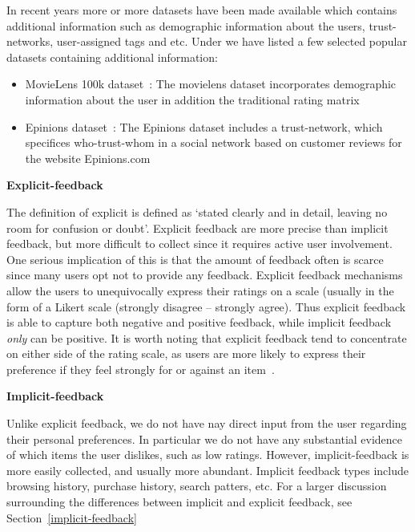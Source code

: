 In recent years more or more datasets have been made available which contains
additional information such as demographic information about the users,
trust-networks, user-assigned tags and etc. Under we have listed a few selected
popular datasets containing additional information:


\begin{itemize}

\item MovieLens 100k dataset~\cite{Movielens}: The movielens dataset
	incorporates demographic information about the user in addition the
	traditional rating matrix

\item Epinions dataset~\cite{Epinions}: The Epinions dataset includes a
	trust-network, which specifices who-trust-whom in a social network based on
	customer reviews for the website Epinions.com

\end{itemize}

\textbf{Explicit-feedback}

The definition of explicit is defined as `stated clearly and in detail, leaving
no room for confusion or doubt'. Explicit feedback are more precise than
implicit feedback, but more difficult to collect since it requires active user
involvement. One serious implication of this is that the amount of feedback
often is scarce since many users opt not to provide any feedback. Explicit
feedback mechanisms allow the users to unequivocally express their ratings on a
scale (usually in the form of a Likert scale (strongly disagree – strongly
agree). Thus explicit feedback is able to capture both negative and positive
feedback, while implicit feedback \emph{only} can be positive. It is worth
noting that explicit feedback tend to concentrate on either side of the rating
scale, as users are more likely to express their preference if they feel
strongly for or against an item~\cite{Jawaheer2010}.

\textbf{Implicit-feedback}


Unlike explicit feedback, we do not have nay direct input from the user
regarding their personal preferences. In particular we do not have any
substantial evidence of which items the user dislikes, such as low ratings.
However, implicit-feedback is more easily collected, and usually more abundant.
Implicit feedback types include browsing history, purchase history, search
patters, etc. For a larger discussion surrounding the differences between
implicit and explicit feedback, see Section~\ref{implicit-feedback}


